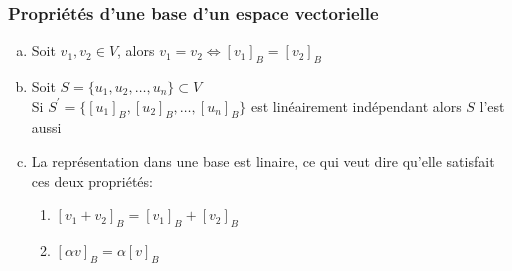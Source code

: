 \subsubsection{Propriétés d'une base d'un espace vectorielle}
\begin{enumerate}[a)]
      \item Soit $v_1, v_2 \in V$, alors $v_1 = v_2 \iff [v_1]_B = [v_2]_B$
      \item Soit $S = \{ u_1, u_2, \ldots, u_n \} \subset V$ \\
            Si $S^\prime = \{ [u_1]_B, [u_2]_B, \ldots, [u_n]_B \}$ est linéairement indépendant alors $S$ l'est aussi
      \item La représentation dans une base est linaire, ce qui veut dire qu'elle satisfait ces deux propriétés:
            \begin{enumerate}[1.]
                  \item $[v_1 + v_2]_B = [v_1]_B + [v_2]_B$
                  \item $[\alpha v]_B = \alpha [v]_B$
            \end{enumerate}
\end{enumerate}